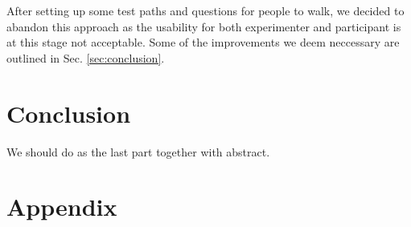 \documentclass[letterpaper]{article}
\begin{document}
After setting up some test paths and questions for people to walk, we decided to abandon this approach as the usability 
for both experimenter and participant is at this stage not acceptable. Some of the improvements we deem neccessary 
are outlined in Sec. \ref{sec:conclusion}.

\section{Conclusion}
We should do as the last part together with abstract.




\section{Appendix}
\end{document}
